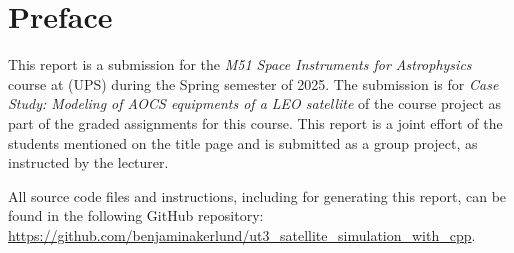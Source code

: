 \section*{Preface}

This report is a submission for the \textit{M51 Space Instruments for Astrophysics} course at (UPS) during the Spring semester of 2025.
The submission is for \textit{Case Study: Modeling of AOCS
equipments of a LEO satellite} of the course project as part of the graded assignments for this course.
This report is a joint effort of the students mentioned on the title page and is submitted as a group project, as instructed by the lecturer.


All source code files and instructions, including for generating this report, can be found in the following GitHub repository: \url{https://github.com/benjaminakerlund/ut3_satellite_simulation_with_cpp}.



%




